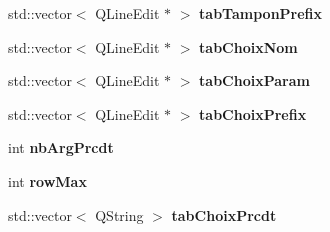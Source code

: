 \begin{DoxyCompactItemize}
\item 
\hypertarget{classConnectionSettings_a07dd3a760944aa5c0df4fc70ec152fd9}{std\+::vector$<$ Q\+Line\+Edit $\ast$ $>$ {\bfseries tab\+Tampon\+Prefix}}\label{classConnectionSettings_a07dd3a760944aa5c0df4fc70ec152fd9}

\item 
\hypertarget{classConnectionSettings_a066cb9704304701e0c87b48002761a56}{std\+::vector$<$ Q\+Line\+Edit $\ast$ $>$ {\bfseries tab\+Choix\+Nom}}\label{classConnectionSettings_a066cb9704304701e0c87b48002761a56}

\item 
\hypertarget{classConnectionSettings_ae95584bcca066a6ccc154ea1158588ac}{std\+::vector$<$ Q\+Line\+Edit $\ast$ $>$ {\bfseries tab\+Choix\+Param}}\label{classConnectionSettings_ae95584bcca066a6ccc154ea1158588ac}

\item 
\hypertarget{classConnectionSettings_a3a6e0f2946dd56bd2c8d9b08a569760c}{std\+::vector$<$ Q\+Line\+Edit $\ast$ $>$ {\bfseries tab\+Choix\+Prefix}}\label{classConnectionSettings_a3a6e0f2946dd56bd2c8d9b08a569760c}

\item 
\hypertarget{classConnectionSettings_a8a046e7e52ea721a4af8eb99123e4bb7}{int {\bfseries nb\+Arg\+Prcdt}}\label{classConnectionSettings_a8a046e7e52ea721a4af8eb99123e4bb7}

\item 
\hypertarget{classConnectionSettings_a8dbd9f61f430a8ad42f8ac6dd85384a7}{int {\bfseries row\+Max}}\label{classConnectionSettings_a8dbd9f61f430a8ad42f8ac6dd85384a7}

\item 
\hypertarget{classConnectionSettings_ac71a066165c1dc84a2a13277ef84f7a1}{std\+::vector$<$ Q\+String $>$ {\bfseries tab\+Choix\+Prcdt}}\label{classConnectionSettings_ac71a066165c1dc84a2a13277ef84f7a1}

\end{DoxyCompactItemize}
